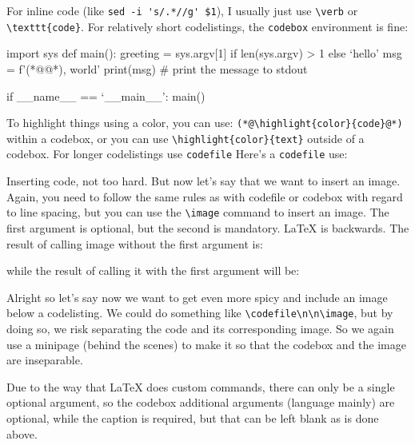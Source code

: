 \documentclass{writeup}
\author{Kevin Sprague}
\begin{document}

\begin{walkthrough}
\step
For inline code (like \verb`sed -i 's/.*//g' $1`), I usually just use \verb|\verb| or \verb|\texttt{code}|. For relatively short codelistings, the \verb|codebox| environment is fine:

\begin{codebox}[language=Python]
import sys
def main():
    greeting = sys.argv[1] if len(sys.argv) > 1 else `hello'
    msg = f'{(*@@*)}, world'
    print(msg) # print the message to stdout

if __name__ == `__main__':
    main()
\end{codebox}

To highlight things using a color, you can use: \verb|(*@\highlight{color}{code}@*)| within a codebox, or you can use \verb|\highlight{color}{text}| outside of a codebox.
\bigbreak
For longer codelistings use \verb|codefile|
\step
Here's a \verb|codefile| use:


\step
Inserting code, not too hard. But now let's say that we want to insert an image. Again, you need to follow the same rules as with codefile or codebox with regard to line spacing, but you can use the \verb|\image| command to insert an image. The first argument is optional, but the second is mandatory. LaTeX is backwards. The result of calling image without the first argument is:


while the result of calling it with the first argument will be: 


\step
Alright so let's say now we want to get even more spicy and include an image below a codelisting. We could do something like \verb`\codefile\n\n\image`, but by doing so, we risk separating the code and its corresponding image. So we again use a minipage (behind the scenes) to make it so that the codebox and the image are inseparable.


Due to the way that LaTeX does custom commands, there can only be a single optional argument, so the codebox additional arguments (language mainly) are optional, while the caption is required, but that can be left blank as is done above.
\end{walkthrough}
\end{document}
